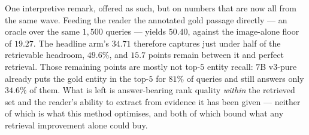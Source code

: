 One interpretive remark, offered as such, but on numbers that are now all from the same wave.
Feeding the reader the annotated gold passage directly --- an oracle over the same $1{,}500$
queries --- yields $50.40$, against the image-alone floor of $19.27$. The headline arm's $34.71$
therefore captures just under half of the retrievable headroom, $49.6\%$, and $15.7$ points remain
between it and perfect retrieval. Those remaining points are mostly not top-$5$ entity recall:
$7$B v3-pure already puts the gold entity in the top-$5$ for $81\%$ of queries and still answers
only $34.6\%$ of them. What is left is answer-bearing rank quality \emph{within} the retrieved set
and the reader's ability to extract from evidence it has been given --- neither of which is what
this method optimises, and both of which bound what any retrieval improvement alone could buy.

